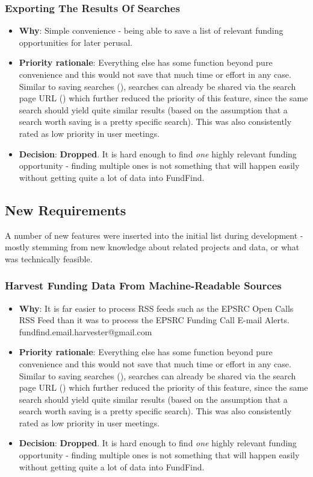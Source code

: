 \subsubsection{Exporting The Results Of Searches}
\begin{itemize}
 \item \textbf{Why}: Simple convenience - being able to save a list of relevant funding opportunities for later perusal.
 \item \textbf{Priority rationale}: Everything else has some function beyond pure convenience and this would not save that much time or effort in any case. Similar to saving searches (), searches can already be shared via the search page URL () which further reduced the priority of this feature, since the same search should yield quite similar results (based on the assumption that a search worth saving is a pretty specific search). This was also consistently rated as low priority in user meetings.
 \item \textbf{Decision}: \textbf{Dropped}. It is hard enough to find \emph{one} highly relevant funding opportunity - finding multiple ones is not something that will happen easily without getting quite a lot of data into FundFind.
\end{itemize}

\subsection{New Requirements}
\label{new-reqs}
A number of new features were inserted into the initial list during development - mostly stemming from new knowledge about related projects and data, or what was technically feasible.

\subsubsection{Harvest Funding Data From Machine-Readable Sources}
\begin{itemize}
 \item \textbf{Why}: It is far easier to process RSS feeds such as the EPSRC Open Calls RSS Feed \cite{epsrc-rss} than it was to process the EPSRC Funding Call E-mail Alerts. fundfind.email.harvester@gmail.com
 \item \textbf{Priority rationale}: Everything else has some function beyond pure convenience and this would not save that much time or effort in any case. Similar to saving searches (), searches can already be shared via the search page URL () which further reduced the priority of this feature, since the same search should yield quite similar results (based on the assumption that a search worth saving is a pretty specific search). This was also consistently rated as low priority in user meetings.
 \item \textbf{Decision}: \textbf{Dropped}. It is hard enough to find \emph{one} highly relevant funding opportunity - finding multiple ones is not something that will happen easily without getting quite a lot of data into FundFind.
\end{itemize}

